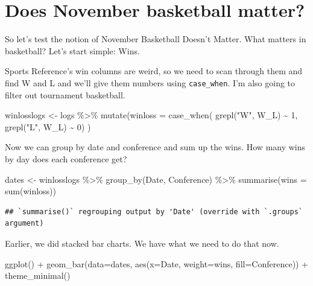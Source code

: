 \documentclass[
]{book}
\newenvironment{Shaded}{\begin{snugshade}}{\end{snugshade}}
\newcommand{\AttributeTok}[1]{\textcolor[rgb]{0.77,0.63,0.00}{#1}}
\newcommand{\DecValTok}[1]{\textcolor[rgb]{0.00,0.00,0.81}{#1}}
\newcommand{\FunctionTok}[1]{\textcolor[rgb]{0.00,0.00,0.00}{#1}}
\newcommand{\NormalTok}[1]{#1}
\newcommand{\OtherTok}[1]{\textcolor[rgb]{0.56,0.35,0.01}{#1}}
\newcommand{\SpecialCharTok}[1]{\textcolor[rgb]{0.00,0.00,0.00}{#1}}
\newcommand{\StringTok}[1]{\textcolor[rgb]{0.31,0.60,0.02}{#1}}
\begin{document}
\hypertarget{does-november-basketball-matter}{%
\section{Does November basketball matter?}\label{does-november-basketball-matter}}

So let's test the notion of November Basketball Doesn't Matter. What matters in basketball? Let's start simple: Wins.

Sports Reference's win columns are weird, so we need to scan through them and find W and L and we'll give them numbers using \texttt{case\_when}. I'm also going to filter out tournament basketball.

\begin{Shaded}
\begin{Highlighting}[]
\NormalTok{winlosslogs }\OtherTok{\textless{}{-}}\NormalTok{ logs }\SpecialCharTok{\%\textgreater{}\%} \FunctionTok{mutate}\NormalTok{(}\AttributeTok{winloss =} \FunctionTok{case\_when}\NormalTok{(}
  \FunctionTok{grepl}\NormalTok{(}\StringTok{"W"}\NormalTok{, W\_L) }\SpecialCharTok{\textasciitilde{}} \DecValTok{1}\NormalTok{, }
  \FunctionTok{grepl}\NormalTok{(}\StringTok{"L"}\NormalTok{, W\_L) }\SpecialCharTok{\textasciitilde{}} \DecValTok{0}\NormalTok{)}
\NormalTok{) }
\end{Highlighting}
\end{Shaded}

Now we can group by date and conference and sum up the wins. How many wins by day does each conference get?

\begin{Shaded}
\begin{Highlighting}[]
\NormalTok{dates }\OtherTok{\textless{}{-}}\NormalTok{ winlosslogs }\SpecialCharTok{\%\textgreater{}\%} \FunctionTok{group\_by}\NormalTok{(Date, Conference) }\SpecialCharTok{\%\textgreater{}\%} \FunctionTok{summarise}\NormalTok{(}\AttributeTok{wins =} \FunctionTok{sum}\NormalTok{(winloss))}
\end{Highlighting}
\end{Shaded}

\begin{verbatim}
## `summarise()` regrouping output by 'Date' (override with `.groups` argument)
\end{verbatim}

Earlier, we did stacked bar charts. We have what we need to do that now.

\begin{Shaded}
\begin{Highlighting}[]
\FunctionTok{ggplot}\NormalTok{() }\SpecialCharTok{+} \FunctionTok{geom\_bar}\NormalTok{(}\AttributeTok{data=}\NormalTok{dates, }\FunctionTok{aes}\NormalTok{(}\AttributeTok{x=}\NormalTok{Date, }\AttributeTok{weight=}\NormalTok{wins, }\AttributeTok{fill=}\NormalTok{Conference)) }\SpecialCharTok{+} \FunctionTok{theme\_minimal}\NormalTok{()}
\end{Highlighting}
\end{Shaded}
\end{document}
